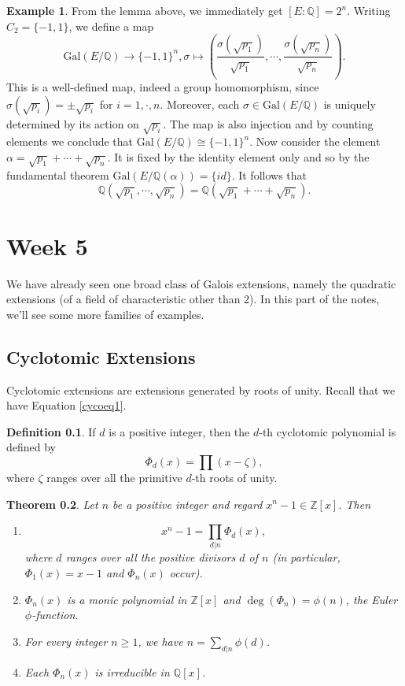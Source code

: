 \documentclass[12pt]{report}
\newtheorem{theorem}{Theorem}[section]
\theoremstyle{definition}
\newtheorem{definition}[theorem]{Definition}
\newtheorem{example}[theorem]{Example}
\newcommand{\Gal}{\text{Gal}}
\newcommand{\ZZ}{\mathbb{Z}}
\newcommand{\QQ}{\mathbb{Q}}
\begin{document}
\begin{example}
	From the lemma above, we immediately get $[E:\QQ]=2^n$. Writing $C_2=\{-1,1\}$, we define a map $$\Gal(E/\QQ) \to \{-1,1\}^n, \sigma \mapsto  (\frac{\sigma(\sqrt{p_1})}{\sqrt{p_1}},\cdots,\frac{\sigma(\sqrt{p_n})}{\sqrt{p_n}}).$$ This is a well-defined map, indeed a group homomorphism, since $\sigma(\sqrt{p_i})=\pm\sqrt{p_i}$ for $i=1,\cdot,n$. Moreover, each $\sigma\in \Gal(E/\QQ)$ is uniquely determined by its action on $\sqrt{p_i}$. The map is also injection and by counting elements we conclude that $\Gal(E/\QQ) \cong \{-1,1\}^n$. Now consider the element $\alpha=\sqrt{p_1}+\cdots+\sqrt{p_n}$. It is fixed by the identity element only and so by the fundamental theorem $\Gal(E/\QQ(\alpha))=\{id\}$. It follows that $$\QQ(\sqrt{p_1},\cdots,\sqrt{p_n})=\QQ(\sqrt{p_1}+\cdots+\sqrt{p_n}).$$
\end{example}

\chapter*{Week 5}
\setcounter{chapter}{5}

We have already seen one broad class of Galois extensions, namely the quadratic extensions (of a field of characteristic other than 2). In this part of the notes, we'll see some more families of examples.

\section{Cyclotomic Extensions}
Cyclotomic extensions are extensions generated by roots of unity. Recall that we have Equation \ref{cycoeq1}.

\begin{definition}
	If $d$ is a positive integer, then the $d$-th cyclotomic polynomial is defined by $$\Phi_d(x) =\prod (x - \zeta),$$ where $\zeta$ ranges over all the primitive $d$-th roots of unity.
\end{definition}

\begin{theorem}
	Let $n$ be a positive integer and regard $x^n - 1 \in  \ZZ[x]$. Then
	\begin{enumerate}
		\item $$x^n-1 = \prod_{d|n} \Phi_d(x),$$ where $d$ ranges over all the positive divisors $d$ of $n$ (in particular, $\Phi_1(x) = x - 1$ and $\Phi_n(x)$ occur).
		\item $\Phi_n(x)$ is a monic polynomial in $\ZZ[x]$ and $\deg(\Phi_n) = \phi(n)$, the Euler $\phi$-function.
		\item For every integer $n\geq 1$, we have $n=\sum_{d|n} \phi(d)$.
		\item Each $\Phi_n(x)$ is irreducible in $\QQ[x]$.
	\end{enumerate}
\end{theorem}
\end{document}
